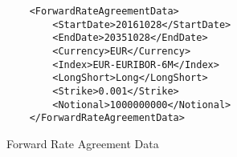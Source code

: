 \begin{listing}[H]
\begin{verbatim}
    <ForwardRateAgreementData>
        <StartDate>20161028</StartDate>
        <EndDate>20351028</EndDate>
        <Currency>EUR</Currency>
        <Index>EUR-EURIBOR-6M</Index>
        <LongShort>Long</LongShort>
        <Strike>0.001</Strike>
        <Notional>1000000000</Notional>
    </ForwardRateAgreementData>
\end{verbatim}
\caption{Forward Rate Agreement Data}
\label{lst:ForwardRateAgreementdata}
\end{listing}